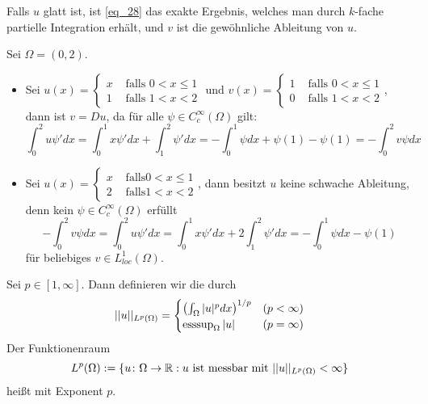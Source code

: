 \begin{bem} \label{bem_54}
	Falls $u$ glatt ist, \marginnote{[54]} ist \eqref{eq_28} das exakte Ergebnis, welches man durch $k$-fache partielle Integration erhält, und $v$ ist die gewöhnliche Ableitung von $u$.
\end{bem}
	
\begin{bsp} \label{bsp_55}
	Sei $\Omega = (0,2)$. \marginnote{[55]}
	\begin{itemize}
		\item Sei $u(x) = \begin{cases}
		x & \text{ falls } 0 < x \leq 1 \\
		1 & \text{ falls } 1 < x < 2
		\end{cases}$ und $v(x) = \begin{cases}
		1 & \text{ falls } 0 < x \leq 1 \\
		0 & \text{ falls } 1 < x < 2
		\end{cases}$, dann ist $v = Du$, da für alle $\psi \in C_c^\infty(\Omega)$ gilt:
		\[ \int_0^2 u\psi' dx = \int_0^1 x \psi' dx + \int_1^2 \psi' dx = -\int_0^1 \psi dx + \psi(1) - \psi(1) = -\int_0^2 v\psi dx \]
		\item Sei $u(x) = \begin{cases}
		 x & \text{ falls} 0 < x \leq 1 \\
		 2 & \text{ falls} 1 < x < 2 \end{cases}$, dann besitzt $u$ keine schwache Ableitung, denn kein $\psi \in C_c^\infty(\Omega)$ erfüllt
		 \[ - \int_0^2 v \psi dx = \int_0^2 u \psi' dx = \int_0^1 x \psi'dx + 2 \int_1^2 \psi' dx = -\int_0^1 \psi dx - \psi(1) \]
		 für beliebiges $v \in L_{loc}^1(\Omega)$.
	\end{itemize}
\end{bsp}
	
\begin{defn} \label{def:lebesgue_raum}
	Sei $p \in [1,\infty]$. Dann definieren wir die  durch
	\[ ||u||_{L^p(\Omega)} = \begin{cases}
		\enbrace*{\int_{\Omega} |u|^p dx}^{1/p} & (p < \infty) \\
		\esssup_\Omega |u| & (p = \infty)
	\end{cases} \]
	Der Funktionenraum
	\[ L^p(\Omega) := \{u \colon \Omega \rightarrow \RR : u \text{ ist messbar mit } ||u||_{L^p(\Omega)} < \infty\} \]
	heißt  mit Exponent $p$.
\end{defn}
	
